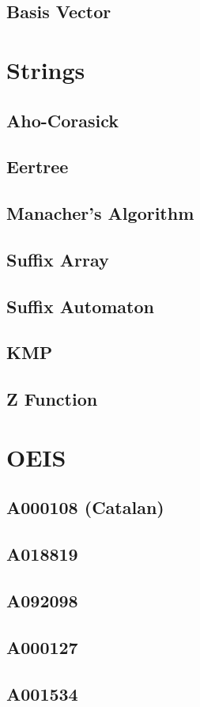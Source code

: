 \subsection{Basis Vector}

\section{Strings}
\subsection{Aho-Corasick}

\subsection{Eertree}

\subsection{Manacher's Algorithm}

\subsection{Suffix Array}

\subsection{Suffix Automaton}

\subsection{KMP}

\subsection{Z Function}

\section{OEIS}
\subsection{A000108 (Catalan)}

\subsection{A018819}

\subsection{A092098}

\subsection{A000127}

\subsection{A001534}


